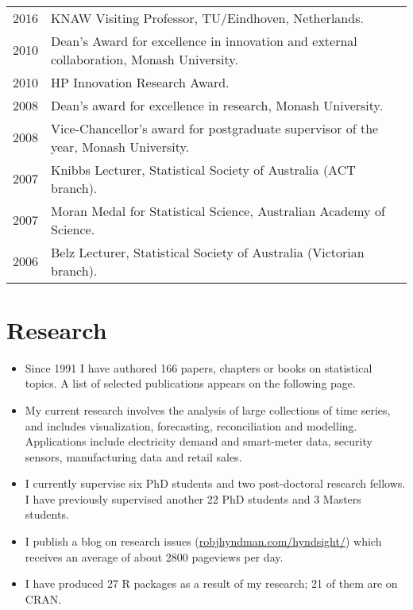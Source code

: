 \documentclass[a4paper,10pt]{article}
\begin{document}
~\begin{tabular}{ll}
2016 & KNAW Visiting Professor, TU/Eindhoven, Netherlands.\\
2010 & Dean's Award for excellence in innovation and external collaboration, Monash University.\\
2010 & HP Innovation Research Award.\\
2008 & Dean's award for excellence in research, Monash University.\\
2008 & Vice-Chancellor's award for postgraduate supervisor of the year, Monash University.\\
2007 & Knibbs Lecturer, Statistical Society of Australia (ACT branch).\\
2007 & Moran Medal for Statistical Science, Australian Academy of Science.\\
2006 & Belz Lecturer, Statistical Society of Australia (Victorian branch).
\end{tabular}

\section{Research}

\begin{itemize}\parskip=0cm
\item Since 1991 I have authored 166 papers, chapters or books on statistical topics. A list of selected publications appears on the following page.
\item  My current research involves the analysis of large collections of time series, and includes visualization, forecasting, reconciliation and modelling. Applications include electricity demand and smart-meter data, security sensors, manufacturing data and retail sales.
\item I currently supervise six PhD students and two post-doctoral research fellows. I have previously supervised another 22 PhD students and 3 Masters students.
\item I publish a blog on research issues (\url{robjhyndman.com/hyndsight/}) which receives an average of about 2800 pageviews per day.
\item I have produced 27 R packages as a result of my research; 21 of them are on CRAN.
\end{itemize}
\end{document}
